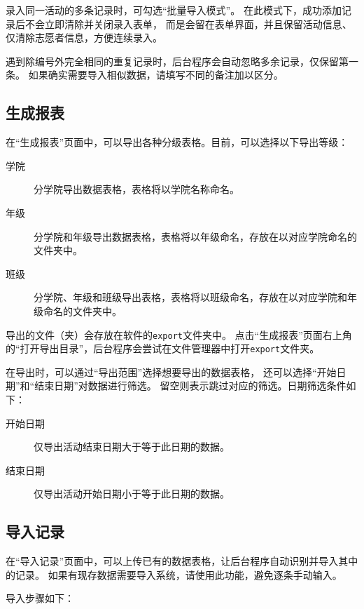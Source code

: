 \documentclass[12pt,titlepage]{article}
\begin{document}
录入同一活动的多条记录时，可勾选“批量导入模式”。
在此模式下，成功添加记录后不会立即清除并关闭录入表单，
而是会留在表单界面，并且保留活动信息、仅清除志愿者信息，方便连续录入。

\begin{warnings}
    \item 遇到除编号外完全相同的重复记录时，后台程序会自动忽略多余记录，仅保留第一条。
    如果确实需要导入相似数据，请填写不同的备注加以区分。
\end{warnings}

\subsection{生成报表}

在“生成报表”页面中，可以导出各种分级表格。目前，可以选择以下导出等级：

\begin{description}
    \item[学院] 分学院导出数据表格，表格将以学院名称命名。
    \item[年级] 分学院和年级导出数据表格，表格将以年级命名，存放在以对应学院命名的文件夹中。
    \item[班级] 分学院、年级和班级导出表格，表格将以班级命名，存放在以对应学院和年级命名的文件夹中。
\end{description}

导出的文件（夹）会存放在软件的\texttt{export}文件夹中。
点击“生成报表”页面右上角的“打开导出目录”，后台程序会尝试在文件管理器中打开\texttt{export}文件夹。

在导出时，可以通过“导出范围”选择想要导出的数据表格，
还可以选择“开始日期”和“结束日期”对数据进行筛选。
留空则表示跳过对应的筛选。日期筛选条件如下：

\begin{description}
    \item[开始日期] 仅导出活动结束日期大于等于此日期的数据。
    \item[结束日期] 仅导出活动开始日期小于等于此日期的数据。
\end{description}

\subsection{导入记录}

在“导入记录”页面中，可以上传已有的数据表格，让后台程序自动识别并导入其中的记录。
如果有现存数据需要导入系统，请使用此功能，避免逐条手动输入。

导入步骤如下：
\end{document}
